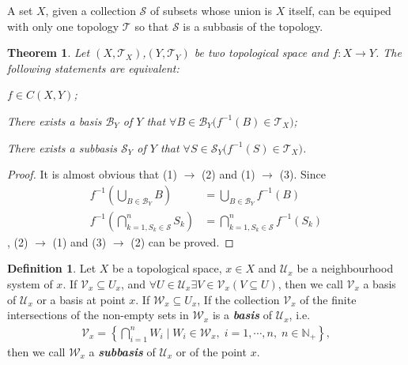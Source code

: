 \documentclass[openany]{book}
\newcommand*{\indexbf}[1]{\emph{\textbf{#1}}\index{#1}} %
\theoremstyle{plain}
\newtheorem{theorem}{Theorem}[section] %
\theoremstyle{definition}
\newtheorem{definition}{Definition}[section] %
\begin{document}
A set $X$, given a collection $\mathscr S$ of subsets whose union is $X$ itself, can be equiped with only one topology $\mathscr T$ so that $\mathscr S$ is a subbasis of the topology. 

\begin{theorem}\label{continuity_basis}
Let $(X,\mathscr T_X)$,$(Y,\mathscr T_Y)$ be two topological space and $f \colon X\to Y$.
The following statements are equivalent:
\begin{conditionlist}[label=(\arabic*)]
\item $f \in C(X, Y)$;
\item There exists a basis $\mathscr B_Y$ of $Y$ that $\forall B\in \mathscr B_Y\big(
	f^{-1}(B) \in \mathscr T_X\big)$;
\item There exists a subbasis $\mathscr S_Y$ of $Y$ that $\forall S\in \mathscr S_Y\big(
	f^{-1}(S) \in \mathscr T_X\big)$.
\end{conditionlist}
\end{theorem}
\begin{proof}
It is almost obvious that (1) $\to$ (2) and (1) $\to$ (3). Since
\begin{align*}
	f^{-1} \left(
		\bigcup_{B\in \mathscr B_Y} B\right) &= \bigcup_{B\in \mathscr B_Y}  f^{-1}(B)\\
	f^{-1}\left(
		\bigcap^n_{k=1,S_k\in \mathscr S} S_k\right) &=\bigcap^n_{k=1,S_k\in \mathscr S} f^{-1}(S_k)
\end{align*}
, (2) $\to$ (1) and (3) $\to$ (2) can be proved. 
\end{proof}

\begin{definition}\label{basis_subbasis_neighbourhood}
Let $X$ be a topological space, $x\in X$ and $\mathscr U_x$ be a neighbourhood system of $x$.
If $\mathscr V_x \subseteq U_x$, and $\forall U\in \mathscr U_x \exists V\in \mathscr V_x (V\subseteq U)$, 
then we call $\mathscr V_x$ a basis of $\mathscr U_x$ or a basis at point $x$.
If $\mathscr W_x \subseteq U_x$, If the collection $\mathscr V_x$ of the finite intersections of the non-empty sets in $\mathscr W_x$ is a \indexbf{basis} of $\mathscr U_x$, i.e.\ 
\begin{align*}
	\mathscr V_x = \left\{
		\bigcap\limits_{i=1}^n W_i \mid
			W_i \in \mathscr W_x,\;i=1,\cdots,n,\;n\in\mathbb N_+\right\},
\end{align*}
then we call $\mathscr W_x$ a \indexbf{subbasis} of $\mathscr U_x$ or of the point $x$.
\end{definition}
\end{document}
